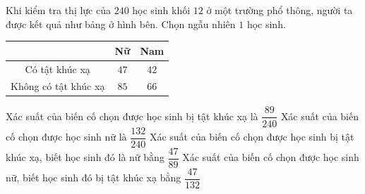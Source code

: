\begin{ex}%
	Khi kiểm tra thị lực của $240$ học sinh khối $12$ ở một trường phổ thông, người ta được kết quả như bảng ở hình bên. Chọn ngẫu nhiên $1$ học  sinh.
	\begin{center}
		\begin{tabular}{|c|c|c|}
			 \hline
			&Nữ &Nam  \\
			\hline 
			Có tật khúc xạ&$47$ &$42$  \\
			 \hline
			Không có  tật khúc xạ&$85$ &$66$ \\
			 \hline
		\end{tabular}
	\end{center}
	 \choiceTF
		{\True Xác suất của biến cố chọn được học sinh bị  tật khúc xạ là $\dfrac{89}{240}$}
		{\True Xác suất của biến cố chọn được học  sinh nữ là $\dfrac{132}{240}$}
		 {Xác suất của biến cố chọn được học sinh bị tật khúc xạ, biết học sinh đó là nữ bằng $\dfrac{47}{89}$}
		{Xác suất của biến cố chọn được học sinh nữ, biết học sinh đó bị tật khúc xạ  bằng $\dfrac{47}{132}$}
\end{ex}

